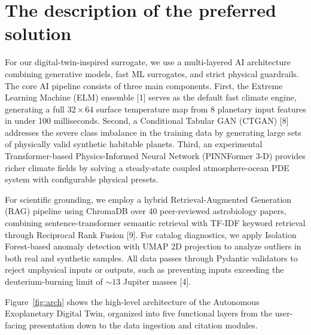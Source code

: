\documentclass[12pt, a4paper]{article}
\begin{document}
\section{The description of the preferred solution}

For our digital-twin-inspired surrogate, we use a multi-layered AI architecture combining generative models, fast ML surrogates, and strict physical guardrails. The core AI pipeline consists of three main components. First, the Extreme Learning Machine (ELM) ensemble [1] serves as the default fast climate engine, generating a full $32 \times 64$ surface temperature map from 8 planetary input features in under 100 milliseconds. Second, a Conditional Tabular GAN (CTGAN) [8] addresses the severe class imbalance in the training data by generating large sets of physically valid synthetic habitable planets. Third, an experimental Transformer-based Physics-Informed Neural Network (PINNFormer 3-D) provides richer climate fields by solving a steady-state coupled atmosphere-ocean PDE system with configurable physical presets.

For scientific grounding, we employ a hybrid Retrieval-Augmented Generation (RAG) pipeline using ChromaDB over 40 peer-reviewed astrobiology papers, combining sentence-transformer semantic retrieval with TF-IDF keyword retrieval through Reciprocal Rank Fusion [9]. For catalog diagnostics, we apply Isolation Forest-based anomaly detection with UMAP 2D projection to analyze outliers in both real and synthetic samples. All data passes through Pydantic validators to reject unphysical inputs or outputs, such as preventing inputs exceeding the deuterium-burning limit of $\sim 13$ Jupiter masses [4].

Figure~\ref{fig:arch} shows the high-level architecture of the Autonomous Exoplanetary Digital Twin, organized into five functional layers from the user-facing presentation down to the data ingestion and citation modules.
\end{document}
